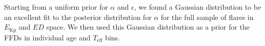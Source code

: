 \documentclass{aa}
\begin{document}
Starting from a uniform prior for $\alpha$ and $\epsilon$, we found a Gaussian distribution to be an excellent fit to the posterior distribution for $\alpha$ for the full sample of flares in $E_\mathrm{Kp}$ and $ED$ space. We then used this Gaussian distribution as a prior for the FFDs in individual age and $T_\mathrm{eff}$ bins. 
\end{document}
